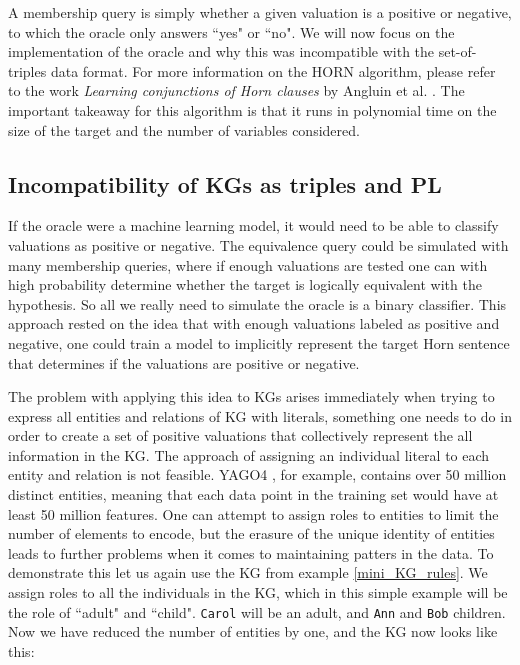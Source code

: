A membership query is simply whether a given valuation is a positive or negative, to which the oracle only answers ``yes" or ``no". We will now focus on the implementation of the oracle and why this was incompatible with the set-of-triples data format. For more information on the HORN algorithm, please refer to the work \textit{Learning conjunctions of Horn clauses} by Angluin et al. \cite{DBLP:journals/ml/AngluinFP92}. The important takeaway for this algorithm is that it runs in polynomial time on the size of the target and the number of variables considered.


\subsection{Incompatibility of KGs as triples and PL}
If the oracle were a machine learning model, it would need to be able to classify valuations as positive or negative. The equivalence query could be simulated with many membership queries, where if enough valuations are tested one can with high probability determine whether the target is logically equivalent with the hypothesis. So all we really need to simulate the oracle is a binary classifier. This approach rested on the idea that with enough valuations labeled as positive and negative, one could train a model to implicitly represent the target Horn sentence that determines if the valuations are positive or negative. 

The problem with applying this idea to KGs arises immediately when trying to express all entities and relations of KG with literals, something one needs to do in order to create a set of positive valuations that collectively represent the all information in the KG. The approach of assigning an individual literal to each entity and relation is not feasible. YAGO4 \cite{pellissier2020yago}, for example, contains over 50 million distinct entities, meaning that each data point in the training set would have at least 50 million features. One can attempt to assign roles to entities to limit the number of elements to encode, but the erasure of the unique identity of entities leads to further problems when it comes to maintaining patters in the data. To demonstrate this let us again use the KG from example \ref{mini_KG_rules}. We assign roles to all the individuals in the KG, which in this simple example will be the role of ``adult" and ``child". \texttt{Carol} will be an adult, and \texttt{Ann} and \texttt{Bob} children. Now we have reduced the number of entities by one, and the KG now looks like this:

